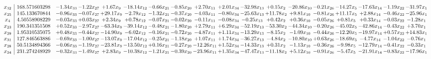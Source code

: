 \documentclass[9pt]{article}
\begin{document}
 \[\begin{array}{c| c c@{\hskip 2pt} c@{\hskip 2pt} c@{\hskip 2pt} c@{\hskip 2pt} c@{\hskip 2pt} c@{\hskip 2pt} c@{\hskip 2pt} c@{\hskip 2pt} c@{\hskip 2pt} c@{\hskip 2pt} c@{\hskip 2pt} c@{\hskip 2pt} c@{\hskip 2pt} c@{\hskip 2pt} c@{\hskip 2pt} c@{\hskip 2pt} }
 x_{32}   &  168.571603298 & -1.34 x_{33} & -1.22 x_{27} & +  1.67 x_{9} & -18.14 x_{12} & -0.66 x_{21} & -0.85 x_{20} & +  2.70 x_{11} & +  2.01 x_{34} & -32.98 x_{13} & +  0.15 x_{2} & -20.86 x_{10} & -0.21 x_{26} & -14.27 x_{5} & -17.63 x_{14} & -1.19 x_{22} & -31.97 x_{1}\\
 x_{25}   &  145.133670844 & -0.96 x_{33} & -0.07 x_{27} & + 29.17 x_{9} & -2.79 x_{12} & -1.32 x_{21} & -0.37 x_{20} & -4.03 x_{11} & -0.80 x_{34} & -25.63 x_{13} & + 11.78 x_{2} & +  9.81 x_{10} & -0.81 x_{26} & + 11.17 x_{5} & +  2.88 x_{14} & -0.46 x_{22} & -25.96 x_{1}\\
 x_{4}   &  4.50558908229 & -0.03 x_{33} & +  0.03 x_{27} & +  2.34 x_{9} & +  0.78 x_{12} & -0.07 x_{21} & -0.02 x_{20} & -0.11 x_{11} & -0.08 x_{34} & -0.25 x_{13} & +  0.42 x_{2} & +  0.36 x_{10} & -0.05 x_{26} & +  0.81 x_{5} & +  0.33 x_{14} & -0.03 x_{22} & -1.28 x_{1}\\
 x_{23}   &  190.341351508 & +  0.52 x_{33} & -2.97 x_{27} & -63.34 x_{9} & -39.14 x_{12} & -0.48 x_{21} & -1.80 x_{20} & +  2.79 x_{11} & +  6.29 x_{34} & -52.19 x_{13} & -53.30 x_{2} & -44.34 x_{10} & -0.20 x_{26} & -45.02 x_{5} & -42.86 x_{14} & -0.43 x_{22} & +  3.70 x_{1}\\
 x_{29}   &  1.95310535075 & +  0.48 x_{33} & -0.44 x_{27} & -14.90 x_{9} & -6.02 x_{12} & -0.16 x_{21} & -0.72 x_{20} & -4.87 x_{11} & +  1.11 x_{34} & -13.29 x_{13} & -8.15 x_{2} & -1.09 x_{10} & -0.44 x_{26} & -12.20 x_{5} & -19.97 x_{14} & +  0.57 x_{22} & + 14.83 x_{1}\\
 x_{31}   &  127.846563886 & -0.69 x_{33} & -1.00 x_{27} & -13.07 x_{9} & -17.04 x_{12} & -0.25 x_{21} & -1.18 x_{20} & +  1.07 x_{11} & +  1.74 x_{34} & -36.27 x_{13} & -4.84 x_{2} & -10.80 x_{10} & +  0.63 x_{26} & -18.69 x_{5} & -4.77 x_{14} & -1.04 x_{22} & -0.76 x_{1}\\
 x_{28}   &  50.5134894366 & -0.06 x_{33} & -1.19 x_{27} & -23.81 x_{9} & -13.50 x_{12} & +  0.16 x_{21} & -0.27 x_{20} & -12.26 x_{11} & +  1.52 x_{34} & -14.33 x_{13} & +  0.31 x_{2} & -1.13 x_{10} & -0.36 x_{26} & -9.98 x_{5} & -12.79 x_{14} & -0.41 x_{22} & -0.33 x_{1}\\
 x_{24}   &  231.274248929 & -0.32 x_{33} & -1.49 x_{27} & +  2.83 x_{9} & -10.38 x_{12} & -1.21 x_{21} & -0.39 x_{20} & -23.96 x_{11} & +  1.35 x_{34} & -47.47 x_{13} & -11.18 x_{2} & +  5.12 x_{10} & -0.91 x_{26} & -5.47 x_{5} & -21.91 x_{14} & -0.83 x_{22} & -17.96 x_{1}\\

\end{array}\]
\end{document}
